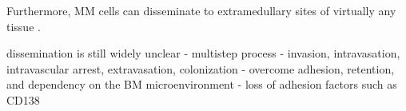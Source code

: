 \label{sec:intro_myeloma_dissemination}
Furthermore, MM cells can disseminate to
extramedullary sites of virtually any tissue
\cite{rajkumarMultipleMyelomaCurrent2020,
    bladeExtramedullaryDiseaseMultiple2022}.



dissemination is still widely unclear
- multistep process
- invasion, intravasation, intravascular arrest, extravasation,
colonization
- overcome adhesion, retention, and dependency on the BM
microenvironment
- loss of adhesion factors such as CD138



